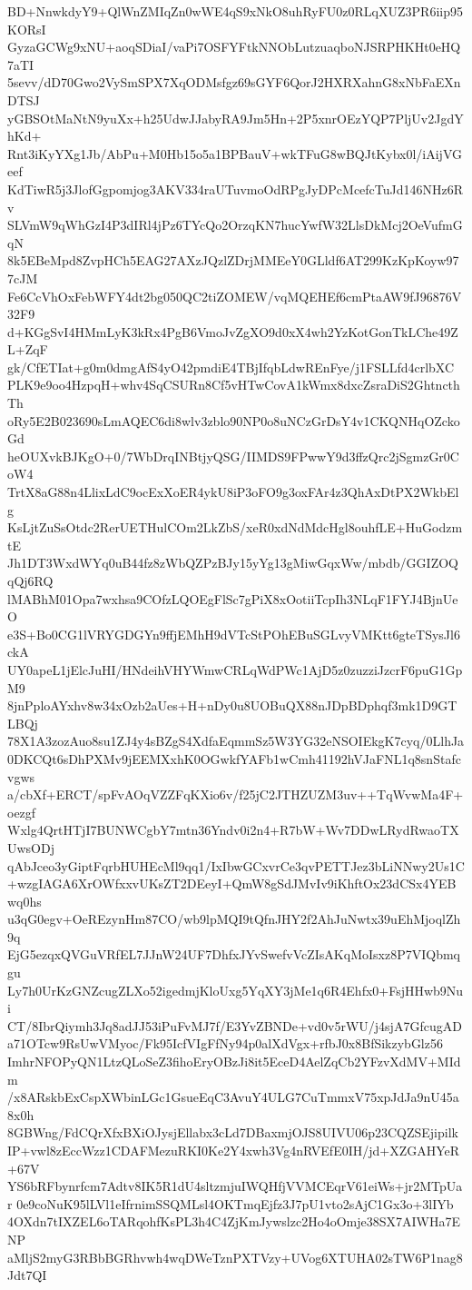 BD+NnwkdyY9+QlWnZMIqZn0wWE4qS9xNkO8uhRyFU0z0RLqXUZ3PR6iip95KORsI
GyzaGCWg9xNU+aoqSDiaI/vaPi7OSFYFtkNNObLutzuaqboNJSRPHKHt0eHQ7aTI
5sevv/dD70Gwo2VySmSPX7XqODMsfgz69sGYF6QorJ2HXRXahnG8xNbFaEXnDTSJ
yGBSOtMaNtN9yuXx+h25UdwJJabyRA9Jm5Hn+2P5xnrOEzYQP7PljUv2JgdYhKd+
Rnt3iKyYXg1Jb/AbPu+M0Hb15o5a1BPBauV+wkTFuG8wBQJtKybx0l/iAijVGeef
KdTiwR5j3JlofGgpomjog3AKV334raUTuvmoOdRPgJyDPcMcefcTuJd146NHz6Rv
SLVmW9qWhGzI4P3dIRl4jPz6TYcQo2OrzqKN7hucYwfW32LlsDkMcj2OeVufmGqN
8k5EBeMpd8ZvpHCh5EAG27AXzJQzlZDrjMMEeY0GLldf6AT299KzKpKoyw977cJM
Fe6CcVhOxFebWFY4dt2bg050QC2tiZOMEW/vqMQEHEf6cmPtaAW9fJ96876V32F9
d+KGgSvI4HMmLyK3kRx4PgB6VmoJvZgXO9d0xX4wh2YzKotGonTkLChe49ZL+ZqF
gk/CfETIat+g0m0dmgAfS4yO42pmdiE4TBjIfqbLdwREnFye/j1FSLLfd4crlbXC
PLK9e9oo4HzpqH+whv4SqCSURn8Cf5vHTwCovA1kWmx8dxcZsraDiS2GhtncthTh
oRy5E2B023690sLmAQEC6di8wlv3zblo90NP0o8uNCzGrDsY4v1CKQNHqOZckoGd
heOUXvkBJKgO+0/7WbDrqINBtjyQSG/IIMDS9FPwwY9d3ffzQrc2jSgmzGr0CoW4
TrtX8aG88n4LlixLdC9ocExXoER4ykU8iP3oFO9g3oxFAr4z3QhAxDtPX2WkbElg
KsLjtZuSsOtdc2RerUETHulCOm2LkZbS/xeR0xdNdMdcHgl8ouhfLE+HuGodzmtE
Jh1DT3WxdWYq0uB44fz8zWbQZPzBJy15yYg13gMiwGqxWw/mbdb/GGIZOQqQj6RQ
lMABhM01Opa7wxhsa9COfzLQOEgFlSc7gPiX8xOotiiTcpIh3NLqF1FYJ4BjnUeO
e3S+Bo0CG1lVRYGDGYn9ffjEMhH9dVTcStPOhEBuSGLvyVMKtt6gteTSysJl6ckA
UY0apeL1jElcJuHI/HNdeihVHYWmwCRLqWdPWc1AjD5z0zuzziJzcrF6puG1GpM9
8jnPploAYxhv8w34xOzb2aUes+H+nDy0u8UOBuQX88nJDpBDphqf3mk1D9GTLBQj
78X1A3zozAuo8su1ZJ4y4sBZgS4XdfaEqmmSz5W3YG32eNSOIEkgK7cyq/0LlhJa
0DKCQt6sDhPXMv9jEEMXxhK0OGwkfYAFb1wCmh41192hVJaFNL1q8snStafcvgws
a/cbXf+ERCT/spFvAOqVZZFqKXio6v/f25jC2JTHZUZM3uv++TqWvwMa4F+oezgf
Wxlg4QrtHTjI7BUNWCgbY7mtn36Yndv0i2n4+R7bW+Wv7DDwLRydRwaoTXUwsODj
qAbJceo3yGiptFqrbHUHEcMl9qq1/IxIbwGCxvrCe3qvPETTJez3bLiNNwy2Us1C
+wzgIAGA6XrOWfxxvUKsZT2DEeyI+QmW8gSdJMvIv9iKhftOx23dCSx4YEBwq0hs
u3qG0egv+OeREzynHm87CO/wb9lpMQI9tQfnJHY2f2AhJuNwtx39uEhMjoqlZh9q
EjG5ezqxQVGuVRfEL7JJnW24UF7DhfxJYvSwefvVcZIsAKqMoIsxz8P7VIQbmqgu
Ly7h0UrKzGNZcugZLXo52igedmjKloUxg5YqXY3jMe1q6R4Ehfx0+FsjHHwb9Nui
CT/8IbrQiymh3Jq8adJJ53iPuFvMJ7f/E3YvZBNDe+vd0v5rWU/j4sjA7GfcugAD
a71OTcw9RsUwVMyoc/Fk95IcfVIgFfNy94p0alXdVgx+rfbJ0x8BfSikzybGlz56
ImhrNFOPyQN1LtzQLoSeZ3fihoEryOBzJi8it5EceD4AelZqCb2YFzvXdMV+MIdm
/x8ARskbExCspXWbinLGc1GsueEqC3AvuY4ULG7CuTmmxV75xpJdJa9nU45a8x0h
8GBWng/FdCQrXfxBXiOJysjEllabx3cLd7DBaxmjOJS8UIVU06p23CQZSEjipilk
IP+vwl8zEccWzz1CDAFMezuRKI0Ke2Y4xwh3Vg4nRVEfE0IH/jd+XZGAHYeR+67V
YS6bRFbynrfcm7Adtv8IK5R1dU4sltzmjuIWQHfjVVMCEqrV61eiWs+jr2MTpUar
0e9coNuK95lLVl1eIfrnimSSQMLsl4OKTmqEjfz3J7pU1vto2sAjC1Gx3o+3lIYb
4OXdn7tIXZEL6oTARqohfKsPL3h4C4ZjKmJywslzc2Ho4oOmje38SX7AIWHa7ENP
aMljS2myG3RBbBGRhvwh4wqDWeTznPXTVzy+UVog6XTUHA02sTW6P1nag8Jdt7QI
